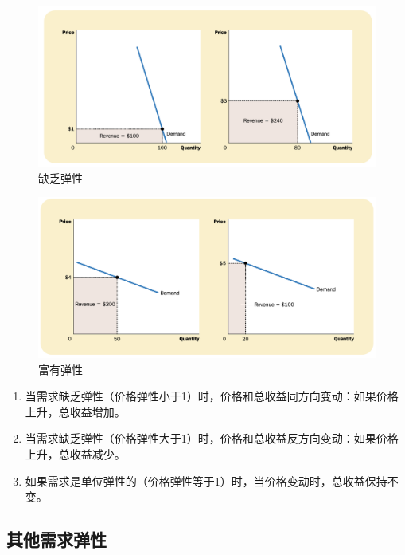 \begin{figure}[!ht]
  \centering
  \includegraphics[width=\textwidth]{pics/inelastic-demand}  
  \caption{缺乏弹性}
  \label{fig:inelastic-demand}
\end{figure}

\begin{figure}[!ht]
  \centering
  \includegraphics[width=\textwidth]{pics/elastic-demand}  
  \caption{富有弹性}
  \label{fig:elastic-demand}
\end{figure}


\begin{enumerate}
\item 当需求缺乏弹性（价格弹性小于1）时，价格和总收益同方向变动：如果价格上升，总收益增加。
\item 当需求缺乏弹性（价格弹性大于1）时，价格和总收益反方向变动：如果价格上升，总收益减少。
\item 如果需求是单位弹性的（价格弹性等于1）时，当价格变动时，总收益保持不变。
\end{enumerate}



\subsection{其他需求弹性}

